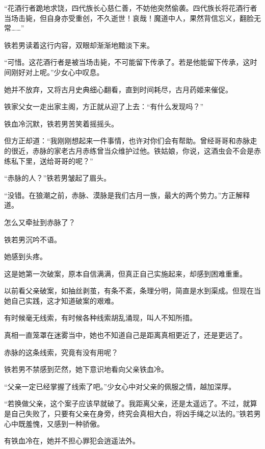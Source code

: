 
\begin{this_body}



“花酒行者跪地求饶，四代族长心慈仁善，不妨他突然偷袭。四代族长将花酒行者当场击毙，但自身亦受重创，不久逝世！哀哉！魔道中人，果然背信忘义，翻脸无常……”

铁若男读着这行内容，双眼却渐渐地黯淡下来。

“可惜。这花酒行者是被当场击毙，不可能留下传承了。若是他能留下传承，这时间刚好对上呢。”少女心中叹息。

她并不放弃，又将古月史典细心翻看，直到时间耗尽，古月药姬来催促。

铁家父女一走出家主阁，方正就从迎了上去：“有什么发现吗？”

铁血冷沉默，铁若男苦笑着摇摇头。

但方正却道：“我刚刚想起来一件事情，也许对你们会有帮助。曾经哥哥和赤脉走的很近，赤脉的家老古月赤练曾当众维护过他。铁姑娘，你说，这酒虫会不会是赤练私下里，送给哥哥的呢？”

“赤脉的人？”铁若男皱起了眉头。

“没错。在狼潮之前，赤脉、漠脉是我们古月一族，最大的两个势力。”方正解释道。

怎么又牵扯到赤脉了？

铁若男沉吟不语。

她感到头疼。

这是她第一次破案，原本自信满满，但真正自己实施起来，却感到困难重重。

以前看父亲破案，如抽丝剥茧，有条不紊，条理分明，简直是水到渠成。但现在当她自己实践，这才知道破案的艰难。

有时候毫无线索，有时候各种线索胡乱涌现，叫人不知所措。

真相一直笼罩在迷雾当中，她也不知道自己是距离真相更近了，还是更远了。

赤脉的这条线索，究竟有没有用呢？

铁若男不禁感到茫然，她下意识地看向父亲铁血冷。

“父亲一定已经掌握了线索了吧。”少女心中对父亲的佩服之情，越加深厚。

“若换做父亲，这个案子应该早就破了。我距离父亲，还是太遥远了。不过，就算是自己失败了，只要有父亲在身旁，终究会真相大白，将凶手绳之以法的。”铁若男心中既羞愧，又感到一种骄傲。

有铁血冷在，她并不担心罪犯会逍遥法外。


\end{this_body}
